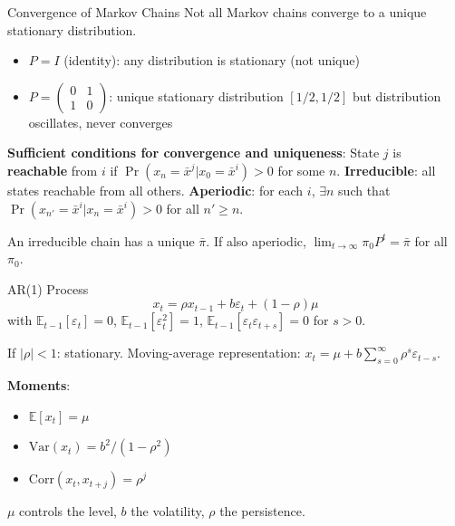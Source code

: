 \documentclass[blue]{beamer}
\newcommand{\E}{\mathbb{E}}
\begin{document}
\begin{frame}{Convergence of Markov Chains}
	Not all Markov chains converge to a unique stationary distribution.

	\begin{itemize}
		\item $P = I$ (identity): any distribution is stationary (not unique)
		\item $P = \begin{pmatrix} 0 & 1 \\ 1 & 0 \end{pmatrix}$: unique stationary distribution $[1/2, 1/2]$ but distribution oscillates, never converges
	\end{itemize}
	
	\bigskip
	\textbf{Sufficient conditions for convergence and uniqueness}: State $j$ is \textbf{reachable} from $i$ if $\Pr(x_n = \bar{x}^j | x_0 = \bar{x}^i) > 0$ for some $n$. \textbf{Irreducible}: all states reachable from all others. \textbf{Aperiodic}: for each $i$, $\exists n$ such that $\Pr(x_{n'} = \bar{x}^i | x_n = \bar{x}^i) > 0$ for all $n' \geq n$.
	
\medskip
	An irreducible chain has a unique $\bar{\pi}$. If also aperiodic, $\lim_{t \to \infty} \pi_0 P^t = \bar{\pi}$ for all $\pi_0$.
\end{frame}

\begin{frame}{AR(1) Process}
	\[
	x_t = \rho x_{t-1} + b\varepsilon_t + (1-\rho)\mu
	\]
	with $\E_{t-1}[\varepsilon_t] = 0$, $\E_{t-1}[\varepsilon_t^2] = 1$, $\E_{t-1}[\varepsilon_t \varepsilon_{t+s}] = 0$ for $s > 0$.
	
	\bigskip
	If $|\rho| < 1$: stationary. Moving-average representation: $x_t = \mu + b\sum_{s=0}^{\infty} \rho^s \varepsilon_{t-s}$.
	
	\bigskip
	\textbf{Moments}:
	\begin{itemize}
		\item $\E[x_t] = \mu$
		\item $\text{Var}(x_t) = b^2/(1 - \rho^2)$
		\item $\text{Corr}(x_t, x_{t+j}) = \rho^j$
	\end{itemize}
	
	$\mu$ controls the level, $b$ the volatility, $\rho$ the persistence.
\end{frame}
\end{document}
